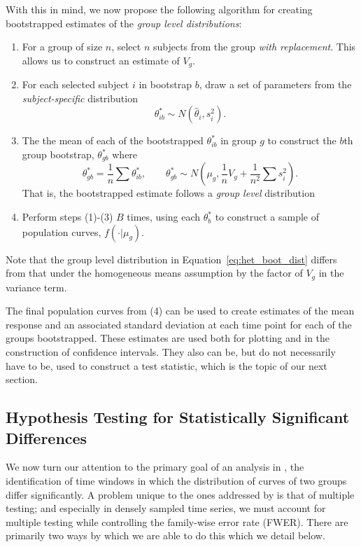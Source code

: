 With this in mind, we now propose the following algorithm for creating bootstrapped estimates of the \textit{group level distributions}:




\begin{enumerate}
\item For a group of size $n$, select $n$ subjects from the group \textit{with replacement}. This allows us to construct an estimate of $V_{g}$.
\item For each selected subject $i$ in bootstrap $b$, draw a set of parameters from the \textit{subject-specific} distribution 
\begin{equation}
\theta_{ib}^* \sim N(\hat{\theta}_i, s_i^2).
\end{equation}
\item The the mean of each of the bootstrapped $\theta_{ib}^*$ in group $g$ to construct the $b$th group bootstrap, $\theta_{gb}^*$ where
\begin{equation}\label{eq:het_boot_dist}
\theta_{gb}^* = \frac1n \sum  \theta_{ib}^*, \qquad \theta_{gb}^* \sim N \left(\mu_g, \frac{1}{n} V_g + \frac{1}{n^2} \sum s_i^2 \right).
\end{equation}
That is, the bootstrapped estimate follows a \textit{group level} distribution
\item Perform steps (1)-(3) $B$ times, using each $\theta_b^*$ to construct a sample of population curves, $f(\cdot| \mu_g)$.
\end{enumerate}

Note that the group level distribution in Equation~\ref{eq:het_boot_dist} differs from that under the homogeneous means assumption by the factor of $V_g$ in the variance term.


The final population curves from (4) can be used to create estimates of the mean response and an associated standard deviation at each time point for each of the groups bootstrapped. These estimates are used both for plotting and in the construction of confidence intervals. They also can be, but do not necessarily have to be, used to construct a test statistic, which is the topic of our next section.

\subsection{Hypothesis Testing  for Statistically Significant Differences}

We now turn our attention to the primary goal of an analysis in , the identification of time windows in which the distribution of curves of two groups differ significantly. A problem unique to the ones addressed by  is that of multiple testing; and especially in densely sampled time series, we must account for multiple testing while controlling the family-wise error rate (FWER). There are primarily two ways by which we are able to do this which we detail below.

